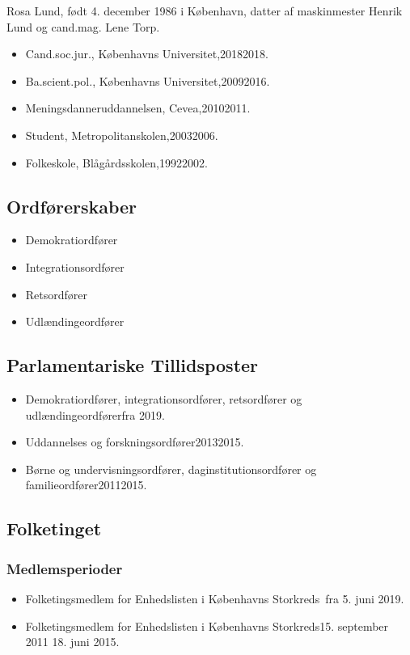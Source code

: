 \documentclass[11pt, a4paper]{awesome-cv}
\begin{document}
\makecvheader[R]
\makelettertitle
\begin{cvletter}
Rosa Lund, født 4. december 1986 i København, datter af maskinmester Henrik Lund og cand.mag. Lene Torp.

\begin{itemize}
\item Cand.soc.jur., Københavns Universitet,20182018.
\item Ba.scient.pol., Københavns Universitet,20092016.
\item Meningsdanneruddannelsen, Cevea,20102011.
\item Student, Metropolitanskolen,20032006.
\item Folkeskole, Blågårdsskolen,19922002.
\end{itemize}
\subsection*{Ordførerskaber}
\begin{itemize}
\item Demokratiordfører
\item Integrationsordfører
\item Retsordfører
\item Udlændingeordfører
\end{itemize}
\subsection*{Parlamentariske Tillidsposter}
\begin{itemize}
\item Demokratiordfører, integrationsordfører, retsordfører og udlændingeordførerfra 2019.
\item Uddannelses og forskningsordfører20132015.
\item Børne og undervisningsordfører, daginstitutionsordfører og familieordfører20112015.
\end{itemize}
\subsection*{Folketinget}
\subsubsection*{Medlemsperioder}
\begin{itemize}
\item Folketingsmedlem for Enhedslisten i Københavns Storkreds fra 5. juni 2019.
\item Folketingsmedlem for Enhedslisten i Københavns Storkreds15. september 2011  18. juni 2015.
\end{itemize}

\end{cvletter}
\end{document}
